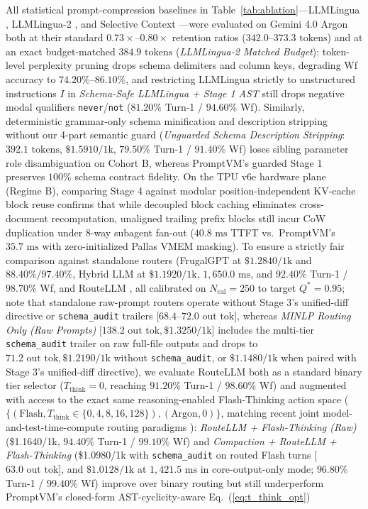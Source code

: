 \documentclass[conference,10pt]{IEEEtran}
\begin{document}
All statistical prompt-compression baselines in Table~\ref{tab:ablation}---LLMLingua \cite{jiang2023llmlingua, jiang2024longllmlingua}, LLMLingua-2 \cite{pan2024llmlingua2}, and Selective Context \cite{li2023selective}---were evaluated on Gemini 4.0 Argon both at their standard $0.73\times\text{--}0.80\times$ retention ratios ($342.0\text{--}373.3\text{ tokens}$) and at an exact budget-matched $384.9\text{ tokens}$ (\textit{LLMLingua-2 Matched Budget}): token-level perplexity pruning drops schema delimiters and column keys, degrading Wf accuracy to $74.20\%\text{--}86.10\%$, and restricting LLMLingua strictly to unstructured instructions $I$ in \textit{Schema-Safe LLMLingua + Stage 1 AST} still drops negative modal qualifiers \texttt{never}/\texttt{not} ($81.20\%$ Turn-1 / $94.60\%$ Wf). Similarly, deterministic grammar-only schema minification and description stripping without our 4-part semantic guard (\textit{Unguarded Schema Description Stripping}: $392.1\text{ tokens}$, $\$1.5910/\text{1k}$, $79.50\%$ Turn-1 / $91.40\%$ Wf) loses sibling parameter role disambiguation on Cohort B, whereas PromptVM's guarded Stage 1 preserves $100\%$ schema contract fidelity. On the TPU v6e hardware plane (Regime B), comparing Stage 4 against modular position-independent KV-cache block reuse \cite{gim2024promptcache} confirms that while decoupled block caching eliminates cross-document recomputation, unaligned trailing prefix blocks still incur CoW duplication under 8-way subagent fan-out ($40.8\text{ ms}$ TTFT vs.\ PromptVM's $35.7\text{ ms}$ with zero-initialized Pallas VMEM masking). To ensure a strictly fair comparison against standalone routers (FrugalGPT \cite{frugalgpt2023} at $\$1.2840/\text{1k}$ and $88.40\% / 97.40\%$, Hybrid LLM \cite{ding2024hybridllm} at $\$1.1920/\text{1k}$, $1{,}650.0\text{ ms}$, and $92.40\%$ Turn-1 / $98.70\%$ Wf, and RouteLLM \cite{ong2025routellm}, all calibrated on $N_{\text{cal}}=250$ to target $Q^*=0.95$; note that standalone raw-prompt routers operate without Stage 3's unified-diff directive or \texttt{schema\_audit} trailers [$68.4\text{--}72.0\text{ out tok}$], whereas \textit{MINLP Routing Only (Raw Prompts)} [$138.2\text{ out tok}, \$1.3250/\text{1k}$] includes the multi-tier \texttt{schema\_audit} trailer on raw full-file outputs and drops to $71.2\text{ out tok}, \$1.2190/\text{1k}$ without \texttt{schema\_audit}, or $\$1.1480/\text{1k}$ when paired with Stage 3's unified-diff directive), we evaluate RouteLLM both as a standard binary tier selector ($T_{\text{think}}=0$, reaching $91.20\%$ Turn-1 / $98.60\%$ Wf) and augmented with access to the exact same reasoning-enabled Flash-Thinking action space ($\{(\text{Flash}, T_{\text{think}} \in \{0, 4, 8, 16, 128\}), (\text{Argon}, 0)\}$, matching recent joint model-and-test-time-compute routing paradigms \cite{ding2024hybridllm, snell2024scaling}): \textit{RouteLLM + Flash-Thinking (Raw)} (\$1.1640/1k, $94.40\%$ Turn-1 / $99.10\%$ Wf) and \textit{Compaction + RouteLLM + Flash-Thinking} (\$1.0980/1k with \texttt{schema\_audit} on routed Flash turns [$63.0\text{ out tok}$], and $\$1.0128/\text{1k}$ at $1{,}421.5\text{ ms}$ in core-output-only mode; $96.80\%$ Turn-1 / $99.40\%$ Wf) improve over binary routing but still underperform PromptVM's closed-form AST-cyclicity-aware Eq.~(\ref{eq:t_think_opt}) 
\end{document}
